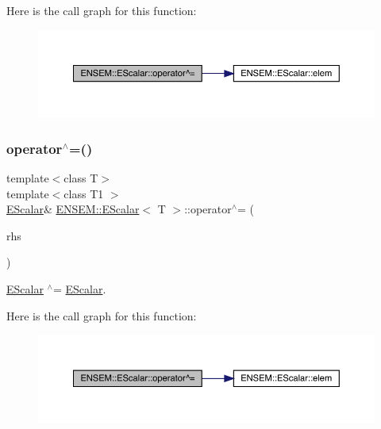 Here is the call graph for this function\+:
\nopagebreak
\begin{figure}[H]
\begin{center}
\leavevmode
\includegraphics[width=350pt]{d0/d82/classENSEM_1_1EScalar_a42c2a63d2eda81643ae8145068db3a8e_cgraph}
\end{center}
\end{figure}
\mbox{\label{classENSEM_1_1EScalar_a42c2a63d2eda81643ae8145068db3a8e}} 
\subsubsection{\texorpdfstring{operator$^\wedge$=()}{operator^=()}\hspace{0.1cm}{\footnotesize\ttfamily [2/3]}}
{\footnotesize\ttfamily template$<$class T$>$ \\
template$<$class T1 $>$ \\
\mbox{\hyperlink{classENSEM_1_1EScalar}{E\+Scalar}}\& \mbox{\hyperlink{classENSEM_1_1EScalar}{E\+N\+S\+E\+M\+::\+E\+Scalar}}$<$ T $>$\+::operator$^\wedge$= (\begin{DoxyParamCaption}\item[{const \mbox{\hyperlink{classENSEM_1_1EScalar}{E\+Scalar}}$<$ T1 $>$ \&}]{rhs }\end{DoxyParamCaption})\hspace{0.3cm}{\ttfamily [inline]}}



\mbox{\hyperlink{classENSEM_1_1EScalar}{E\+Scalar}} $^\wedge$= \mbox{\hyperlink{classENSEM_1_1EScalar}{E\+Scalar}}. 

Here is the call graph for this function\+:
\nopagebreak
\begin{figure}[H]
\begin{center}
\leavevmode
\includegraphics[width=350pt]{d0/d82/classENSEM_1_1EScalar_a42c2a63d2eda81643ae8145068db3a8e_cgraph}
\end{center}
\end{figure}
\mbox{\label{classENSEM_1_1EScalar_a42c2a63d2eda81643ae8145068db3a8e}} 
